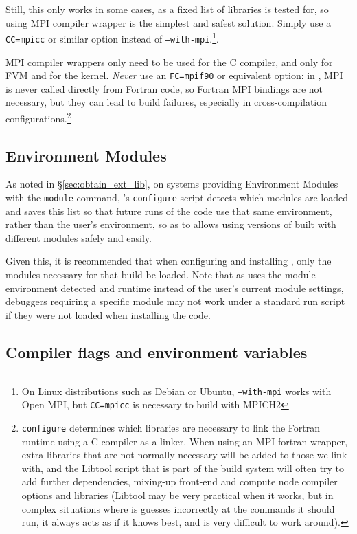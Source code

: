 \documentclass[a4paper,10pt,twoside]{article}
\begin{document}
Still, this only works in some cases, as a fixed list of libraries
is tested for, so using MPI compiler wrapper is the simplest and safest
solution. Simply use a \texttt{CC=mpicc} or similar option instead
of \texttt{--with-mpi}.\footnote{On Linux distributions such
as Debian or Ubuntu, \texttt{--with-mpi} works with Open MPI, but
\texttt{CC=mpicc} is necessary to build with MPICH2}.

MPI compiler wrappers only need to be used for the C compiler,
and only for FVM and for the kernel.
\emph{Never} use an \texttt{FC=mpif90}
or equivalent option: in \CS, MPI is never called directly from Fortran code,
so Fortran MPI bindings are not necessary, but they can lead to
build failures, especially in cross-compilation
configurations.\footnote{\texttt{configure} determines which libraries are
necessary to link the Fortran runtime using a C compiler as a linker.
When using an MPI fortran wrapper, extra libraries that are not normally
necessary will be added to those we link with, and the Libtool script
that is part of the build system will often try to add further dependencies,
mixing-up front-end and compute node compiler options and
libraries (Libtool may be very practical when it works, but in complex
situations where is guesses incorrectly at the commands it should run, it always
acts as if it knows best, and is very difficult to work around).}

\subsection{Environment Modules\label{sec:config:envmode}}

As noted in \S\ref{sec:obtain_ext_lib}, on systems providing
Environment Modules with the {\tt module} command, \CS's {\tt configure}
script detects which modules are loaded and saves
this list so that future runs of the code use that same environment,
rather than the user's environment, so as to allows using versions of
\CS built with different modules safely and easily.

Given this, it is recommended that when configuring and installing
\CS, only the modules necessary for that build be loaded.
Note that as \CS uses the module
environment detected and runtime instead of the user's current
module settings, debuggers requiring a specific module may
not work under a standard run script if they were not loaded when
installing the code.

\subsection{Compiler flags and environment variables\label{sec:config:flags}}
\end{document}
